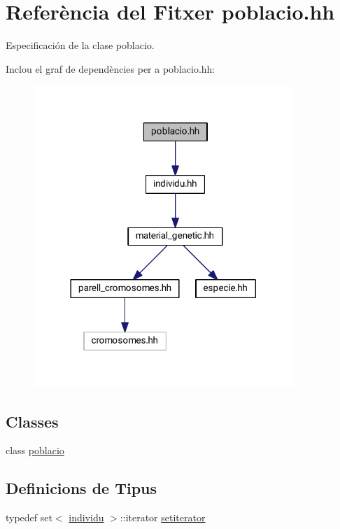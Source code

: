 \hypertarget{poblacio_8hh}{}\section{Referència del Fitxer poblacio.\+hh}
\label{poblacio_8hh}


Especificación de la clase poblacio.  


Inclou el graf de dependències per a poblacio.\+hh\+:
\nopagebreak
\begin{figure}[H]
\begin{center}
\leavevmode
\includegraphics[width=278pt]{poblacio_8hh__incl}
\end{center}
\end{figure}
\subsection*{Classes}
\begin{DoxyCompactItemize}
\item 
class \hyperlink{classpoblacio}{poblacio}
\end{DoxyCompactItemize}
\subsection*{Definicions de Tipus}
\begin{DoxyCompactItemize}
\item 
typedef set$<$ \hyperlink{classindividu}{individu} $>$\+::iterator \hyperlink{poblacio_8hh_a54fb6ab8ec9e9336d208b860dca1513d}{setiterator}
\end{DoxyCompactItemize}


